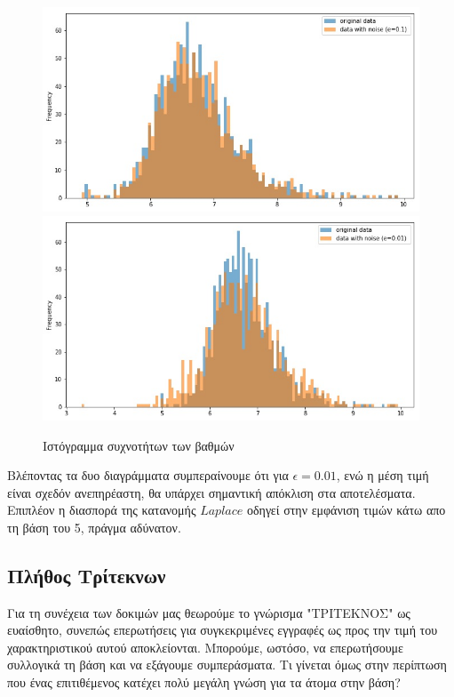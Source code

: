 \begin{figure} [ht]
\begin{center}
  \includegraphics[scale=0.59]{images/hist01.jpg}
  \includegraphics[scale=0.59]{images/hist001.jpg}
  \caption{Ιστόγραμμα συχνοτήτων των βαθμών}
  \end{center}
\end{figure}

Βλέποντας τα δυο διαγράμματα συμπεραίνουμε ότι για $\epsilon=0.01$, ενώ η μέση τιμή είναι σχεδόν ανεπηρέαστη, θα υπάρχει σημαντική απόκλιση στα αποτελέσματα. Επιπλέον η διασπορά της κατανομής $Laplace$ οδηγεί στην εμφάνιση τιμών κάτω απο τη βάση του 5, πράγμα αδύνατον. 





\clearpage
\subsection{Πλήθος Τρίτεκνων}

Για τη συνέχεια των δοκιμών μας θεωρούμε το γνώρισμα "ΤΡΙΤΕΚΝΟΣ" ως ευαίσθητο, συνεπώς επερωτήσεις για συγκεκριμένες εγγραφές ως προς την τιμή του χαρακτηριστικού αυτού αποκλείονται. Μπορούμε, ωστόσο, να επερωτήσουμε συλλογικά τη βάση και να εξάγουμε συμπεράσματα. Τι γίνεται όμως στην περίπτωση που ένας επιτιθέμενος κατέχει πολύ μεγάλη γνώση για τα άτομα στην βάση?

